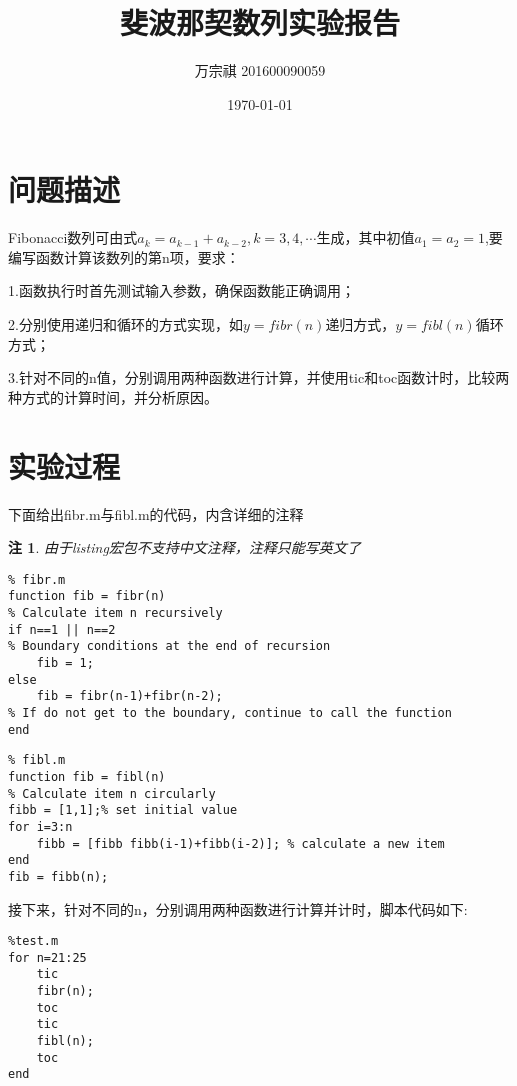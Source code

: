 \documentclass[UTF8]{ctexart}
\title{斐波那契数列实验报告}
\author{万宗祺 201600090059}
\date{\today}
\newtheorem*{note}{注}
\begin{document}
\maketitle
\tableofcontents
\section{问题描述}
Fibonacci数列可由式$a_k = a_{k-1}+a_{k-2},k=3,4,\cdots$生成，其中初值$a_1=a_2=1$,要编写函数计算该数列的第n项，要求：

1.函数执行时首先测试输入参数，确保函数能正确调用；

2.分别使用递归和循环的方式实现，如$y=fibr(n)$递归方式，$y=fibl(n)$循环方式；

3.针对不同的n值，分别调用两种函数进行计算，并使用tic和toc函数计时，比较两种方式的计算时间，并分析原因。

\section{实验过程}
下面给出fibr.m与fibl.m的代码，内含详细的注释
\begin{note}
由于listing宏包不支持中文注释，注释只能写英文了
\end{note}
\lstset{language=Matlab}
\begin{lstlisting}
% fibr.m
function fib = fibr(n)
% Calculate item n recursively 
if n==1 || n==2 
% Boundary conditions at the end of recursion 
    fib = 1;
else
    fib = fibr(n-1)+fibr(n-2); 
% If do not get to the boundary, continue to call the function
end
\end{lstlisting}

\begin{lstlisting}
% fibl.m
function fib = fibl(n)
% Calculate item n circularly
fibb = [1,1];% set initial value
for i=3:n 
    fibb = [fibb fibb(i-1)+fibb(i-2)]; % calculate a new item
end
fib = fibb(n);
\end{lstlisting}

接下来，针对不同的n，分别调用两种函数进行计算并计时，脚本代码如下:

\begin{lstlisting}
%test.m
for n=21:25
    tic
    fibr(n);
    toc
    tic
    fibl(n);
    toc
end
\end{lstlisting}
\end{document}
